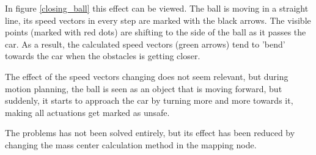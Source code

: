 In figure \ref{closing_ball} this effect can be viewed. The ball is moving in a straight line, its speed vectors in every step are marked with the black arrows. The visible points (marked with red dots) are shifting to the side of the ball as it passes the car. As a result, the calculated speed vectors (green arrows) tend to 'bend' towards the car when the obstacles is getting closer.

The effect of the speed vectors changing does not seem relevant, but during motion planning, the ball is seen as an object that is moving forward, but suddenly, it starts to approach the car by turning more and more towards it, making all actuations get marked as unsafe.

The problems has not been solved entirely, but its effect has been reduced by changing the mass center calculation method in the mapping node.